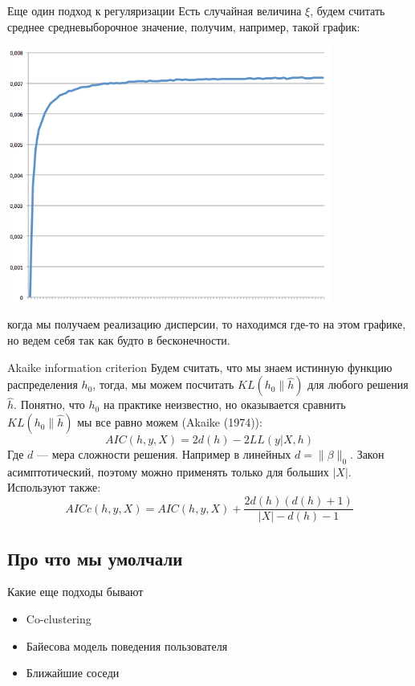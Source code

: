 \documentclass[14pt, fleqn, xcolor={dvipsnames, table}]{beamer}
\begin{document}
\begin{frame}{Еще один подход к регуляризации}
\small
Есть случайная величина $\xi$, будем считать среднее средневыборочное значение, получим, например, такой график:
\begin{center}
\includegraphics[height=0.5\textheight, width=0.8\textwidth]{D.png}
\end{center}
когда мы получаем реализацию дисперсии, то находимся где-то на этом графике, но ведем себя так как будто в бесконечности.
\end{frame}

\begin{frame}{Akaike information criterion}
\small
Будем считать, что мы знаем истинную функцию распределения $h_0$, тогда, мы можем посчитать $KL(h_0 \| \hat{h})$ для любого решения $\hat{h}$. Понятно, что $h_0$ на практике неизвестно, но оказывается сравнить $KL(h_0 \| \hat{h})$ мы все равно можем (Akaike (1974)):
$$AIC(h, y, X) = 2d(h) - 2 LL(y|X,h)$$
Где $d$ --- мера сложности решения. Например в линейных $d = \|\beta\|_0$. Закон асимптотический, поэтому можно применять только для больших $|X|$. Используют также:
$$
AICc(h, y, X) = AIC(h,y,X) + \frac{2d(h)(d(h) + 1)}{|X| - d(h) - 1}
$$
\end{frame}

\subsection{Про что мы умолчали}
\begin{frame}{Какие еще подходы бывают}
\begin{itemize}
  \item Co-clustering
  \item Байесова модель поведения пользователя
  \item Ближайшие соседи  
\end{itemize}
\end{frame}
\end{document}
